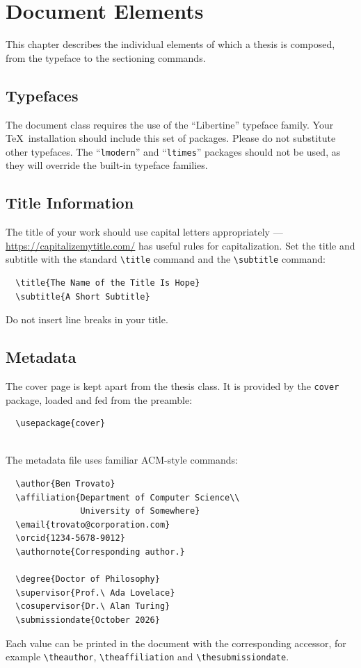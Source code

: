 \chapter{Document Elements}
\label{ch:elements}

This chapter describes the individual elements of which a thesis is
composed, from the typeface to the sectioning commands.

\section{Typefaces}
\label{sec:typefaces}

The document class requires the use of the ``Libertine'' typeface
family. Your \TeX\ installation should include this set of packages.
Please do not substitute other typefaces. The ``\verb|lmodern|'' and
``\verb|ltimes|'' packages should not be used, as they will override the
built-in typeface families.

\section{Title Information}
\label{sec:title}

The title of your work should use capital letters appropriately ---
\url{https://capitalizemytitle.com/} has useful rules for
capitalization. Set the title and subtitle with the standard
\verb|\title| command and the \verb|\subtitle| command:
\begin{verbatim}
  \title{The Name of the Title Is Hope}
  \subtitle{A Short Subtitle}
\end{verbatim}
Do not insert line breaks in your title.

\section{Metadata}
\label{sec:metadata}

The cover page is kept apart from the thesis class. It is provided by the
\texttt{cover} package, loaded and fed from the preamble:
\begin{verbatim}
  \usepackage{cover}
  
\end{verbatim}
The metadata file uses familiar ACM-style commands:
\begin{verbatim}
  \author{Ben Trovato}
  \affiliation{Department of Computer Science\\
               University of Somewhere}
  \email{trovato@corporation.com}
  \orcid{1234-5678-9012}
  \authornote{Corresponding author.}

  \degree{Doctor of Philosophy}
  \supervisor{Prof.\ Ada Lovelace}
  \cosupervisor{Dr.\ Alan Turing}
  \submissiondate{October 2026}
\end{verbatim}
Each value can be printed in the document with the corresponding
accessor, for example \verb|\theauthor|, \verb|\theaffiliation| and
\verb|\thesubmissiondate|.

